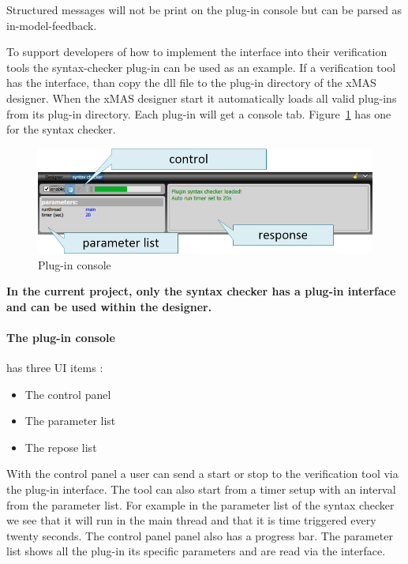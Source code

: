 Structured messages will not be print on the plug-in console but can be parsed as
in-model-feedback.

To support developers of how to implement the interface into their verification
tools the syntax-checker plug-in can be used as an example. If a verification
tool has the interface, than copy the dll file to the plug-in directory of the
xMAS designer. When the xMAS designer start it automatically loads all valid
plug-ins from its plug-in directory. Each plug-in will get a console tab.
Figure~\ref{fig:plug-in-console} has one for the syntax checker.

\begin{figure}[here]
\begin{center}	
	\includegraphics[width=.70\linewidth]{pictures/plug-in-console}
	\caption{Plug-in console}
	\label{fig:plug-in-console}
\end{center}
\end{figure}

\begin{tcolorbox}[colback=white]
\textbf{
In the current project, only the syntax checker has a plug-in interface and can
be used within the designer.
}
\end{tcolorbox}

\paragraph{The plug-in console}has three UI items :
\begin{itemize}
\item The control panel
\item The parameter list
\item The repose list
\end{itemize}

With the control panel a user can send a start or stop to the verification tool
via the plug-in interface. The tool can also start from a timer setup with an
interval from the parameter list. For example in the parameter list of the
syntax checker we see that it will run in the main thread and that it is time
triggered every twenty seconds. The control panel panel also has a progress bar.
The parameter list shows all the plug-in its specific parameters and are read
via the interface.

